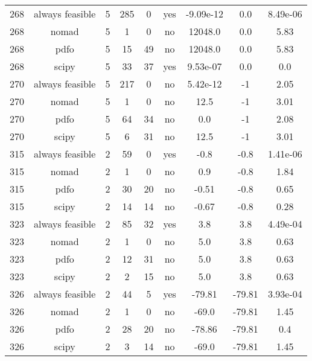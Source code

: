 \begin{scriptsize}
\begin{center}
\begin{longtable}{ccccccccc}
268 & always feasible &  5 &    285 &      0 &     yes &   -9.09e-12 &         0.0 & 8.49e-06\\
268 &           nomad &  5 &      1 &      0 &      no &     12048.0 &         0.0 &     5.83\\
268 &            pdfo &  5 &     15 &     49 &      no &     12048.0 &         0.0 &     5.83\\
268 &           scipy &  5 &     33 &     37 &     yes &    9.53e-07 &         0.0 &      0.0\\
270 & always feasible &  5 &    217 &      0 &      no &    5.42e-12 &          -1 &     2.05\\
270 &           nomad &  5 &      1 &      0 &      no &        12.5 &          -1 &     3.01\\
270 &            pdfo &  5 &     64 &     34 &      no &         0.0 &          -1 &     2.08\\
270 &           scipy &  5 &      6 &     31 &      no &        12.5 &          -1 &     3.01\\
315 & always feasible &  2 &     59 &      0 &     yes &        -0.8 &        -0.8 & 1.41e-06\\
315 &           nomad &  2 &      1 &      0 &      no &         0.9 &        -0.8 &     1.84\\
315 &            pdfo &  2 &     30 &     20 &      no &       -0.51 &        -0.8 &     0.65\\
315 &           scipy &  2 &     14 &     14 &      no &       -0.67 &        -0.8 &     0.28\\
323 & always feasible &  2 &     85 &     32 &     yes &         3.8 &         3.8 & 4.49e-04\\
323 &           nomad &  2 &      1 &      0 &      no &         5.0 &         3.8 &     0.63\\
323 &            pdfo &  2 &     12 &     31 &      no &         5.0 &         3.8 &     0.63\\
323 &           scipy &  2 &      2 &     15 &      no &         5.0 &         3.8 &     0.63\\
326 & always feasible &  2 &     44 &      5 &     yes &      -79.81 &      -79.81 & 3.93e-04\\
326 &           nomad &  2 &      1 &      0 &      no &       -69.0 &      -79.81 &     1.45\\
326 &            pdfo &  2 &     28 &     20 &      no &      -78.86 &      -79.81 &      0.4\\
326 &           scipy &  2 &      3 &     14 &      no &       -69.0 &      -79.81 &     1.45\\

\end{longtable}
\end{center}
\end{scriptsize}
